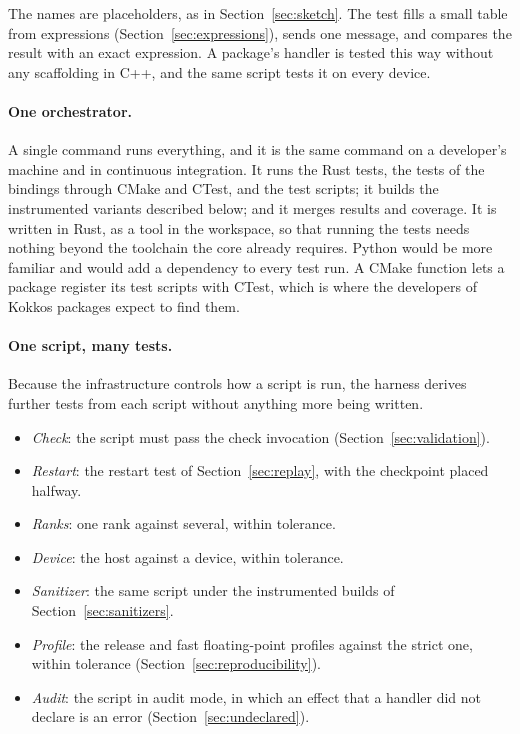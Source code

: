 \documentclass[11pt,a4paper]{article}
\begin{document}
The names are placeholders, as in Section~\ref{sec:sketch}.  The test fills
a small table from expressions (Section~\ref{sec:expressions}), sends one
message, and compares the result with an exact expression.  A package's
handler is tested this way without any scaffolding in C++, and the same
script tests it on every device.

\paragraph{One orchestrator.}  A single command runs everything, and it is
the same command on a developer's machine and in continuous integration.
It runs the Rust tests, the tests of the bindings through CMake and CTest,
and the test scripts; it builds the instrumented variants described below;
and it merges results and coverage.  It is written in Rust, as a tool in the
workspace, so that running the tests needs nothing beyond the toolchain the
core already requires.  Python would be more familiar and would add a
dependency to every test run.  A CMake function lets a package register its
test scripts with CTest, which is where the developers of Kokkos packages
expect to find them.

\paragraph{One script, many tests.}  Because the infrastructure controls how
a script is run, the harness derives further tests from each script without
anything more being written.

\begin{itemize}
  \item \emph{Check}: the script must pass the check invocation
        (Section~\ref{sec:validation}).
  \item \emph{Restart}: the restart test of Section~\ref{sec:replay}, with
        the checkpoint placed halfway.
  \item \emph{Ranks}: one rank against several, within tolerance.
  \item \emph{Device}: the host against a device, within tolerance.
  \item \emph{Sanitizer}: the same script under the instrumented builds of
        Section~\ref{sec:sanitizers}.
  \item \emph{Profile}: the release and fast floating-point profiles against
        the strict one, within tolerance (Section~\ref{sec:reproducibility}).
  \item \emph{Audit}: the script in audit mode, in which an effect that a
        handler did not declare is an error (Section~\ref{sec:undeclared}).
\end{itemize}
\end{document}
